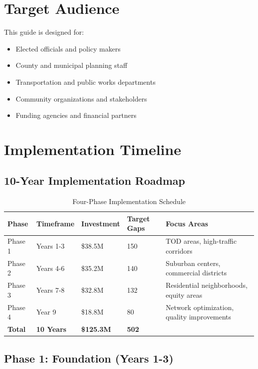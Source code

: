 \documentclass[11pt,letterpaper]{article}
\begin{document}
\section{Target Audience}

This guide is designed for:
\begin{itemize}
    \item Elected officials and policy makers
    \item County and municipal planning staff
    \item Transportation and public works departments
    \item Community organizations and stakeholders
    \item Funding agencies and financial partners
\end{itemize}

\section{Implementation Timeline}

\subsection{10-Year Implementation Roadmap}

\begin{table}[h]
\centering
\caption{Four-Phase Implementation Schedule}
\begin{tabular}{p{2cm}p{3cm}p{2.5cm}p{2.5cm}p{2cm}}
\toprule
\textbf{Phase} & \textbf{Timeframe} & \textbf{Investment} & \textbf{Target Gaps} & \textbf{Focus Areas} \\
\midrule
Phase 1 & Years 1-3 & \$38.5M & 150 & TOD areas, high-traffic corridors \\
Phase 2 & Years 4-6 & \$35.2M & 140 & Suburban centers, commercial districts \\
Phase 3 & Years 7-8 & \$32.8M & 132 & Residential neighborhoods, equity areas \\
Phase 4 & Year 9 & \$18.8M & 80 & Network optimization, quality improvements \\
\midrule
\textbf{Total} & \textbf{10 Years} & \textbf{\$125.3M} & \textbf{502} & \\
\bottomrule
\end{tabular}
\end{table}

\subsection{Phase 1: Foundation (Years 1-3)}
\end{document}
